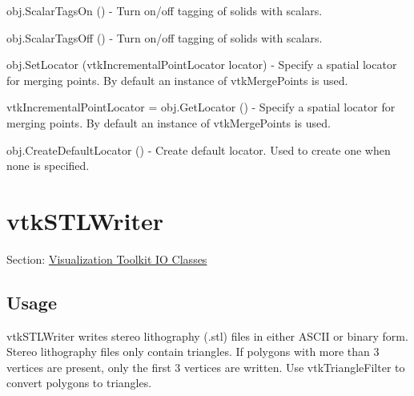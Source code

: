 \begin{DoxyItemize}
\item {\ttfamily obj.\-Scalar\-Tags\-On ()} -\/ Turn on/off tagging of solids with scalars.  
\item {\ttfamily obj.\-Scalar\-Tags\-Off ()} -\/ Turn on/off tagging of solids with scalars.  
\item {\ttfamily obj.\-Set\-Locator (vtk\-Incremental\-Point\-Locator locator)} -\/ Specify a spatial locator for merging points. By default an instance of vtk\-Merge\-Points is used.  
\item {\ttfamily vtk\-Incremental\-Point\-Locator = obj.\-Get\-Locator ()} -\/ Specify a spatial locator for merging points. By default an instance of vtk\-Merge\-Points is used.  
\item {\ttfamily obj.\-Create\-Default\-Locator ()} -\/ Create default locator. Used to create one when none is specified.  
\end{DoxyItemize}\hypertarget{vtkio_vtkstlwriter}{}\section{vtk\-S\-T\-L\-Writer}\label{vtkio_vtkstlwriter}
Section\-: \hyperlink{sec_vtkio}{Visualization Toolkit I\-O Classes} \hypertarget{vtkwidgets_vtkxyplotwidget_Usage}{}\subsection{Usage}\label{vtkwidgets_vtkxyplotwidget_Usage}
vtk\-S\-T\-L\-Writer writes stereo lithography (.stl) files in either A\-S\-C\-I\-I or binary form. Stereo lithography files only contain triangles. If polygons with more than 3 vertices are present, only the first 3 vertices are written. Use vtk\-Triangle\-Filter to convert polygons to triangles.

